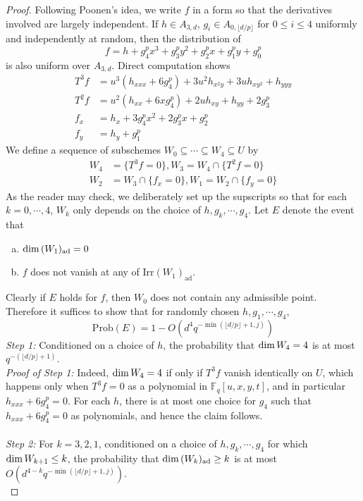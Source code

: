 \documentclass[12pt]{article}
\theoremstyle{plain}
\theoremstyle{definition}
\newcommand{\IF}{\mathbb{F}}
\renewcommand\dim{{\rm dim\,}}
\newcommand{\<}{\langle}
\renewcommand{\>}{\rangle}
\newcommand{\Prob}{\mathrm{Prob}}
\newcommand{\ad}{\mathrm{ad}}
\newcommand{\yk}{\lfloor d/p \rfloor}
\newcommand{\Irr}{\mathrm{Irr}}
\begin{document}
\begin{proof}
Following Poonen's idea, we write $f$ in a form so that the derivatives involved are largely independent. If $h \in A_{3, d}$, $g_i \in A_{0, \yk}$ for $0 \le i \le 4$ uniformly and independently at random, then the distribution of 
$$ f = h + g_4^p x^3  + g_3^p y^2 + g_2^p x + g_1^p y + g_0^p  $$ 
is also uniform over $A_{3, d}$. 
Direct computation shows 
\begin{align*}
T^3 f &= u^3(h_{xxx} + 6 g_4^p) + 3 u^2 h_{x^2 y} + 3 u h_{xy^2} + h_{yyy} \\
T^2 f &= u^2(h_{xx} + 6x g_4^p) + 2 u h_{xy} + h_{yy} + 2 g_3^p \\
f_x &= h_x + 3 g_4^p x^2 + 2 g_3^p x + g_2^p \\
f_y &= h_y + g_1^p
\end{align*}
We define a sequence of subschemes $W_0 \subseteq \cdots \subseteq W_4 \subseteq U$ by 
\begin{align*}
W_4 &= \{ T^3 f = 0 \}, W_3 = W_4 \cap \{ T^2 f = 0 \} \\
W_2 &= W_3 \cap \{ f_x = 0 \}, W_1 = W_2 \cap \{ f_y = 0 \}
\end{align*}
As the reader may check, we deliberately set up the supscripts so that for each $k = 0,\cdots, 4$, $W_k$ only depends on the choice of $h, g_{k}, \cdots, g_4$. Let $E$ denote the event that 
\begin{enumerate}[a.]
\item $\dim (W_1)_\ad = 0$
\item $f$ does not vanish at any of $\Irr (W_1)_\ad$. 
\end{enumerate} 
Clearly if $E$ holds for $f$, then $W_0$ does not contain any admissible point. Therefore it suffices to show that for randomly chosen $h, g_1, \cdots, g_4$,
$$ \Prob(E) = 1 - O(d^4 q^{- \min(\yk + 1, j)})$$
\textit{Step 1:} Conditioned on a choice of $h$, the probability that $\dim W_4 = 4$ is at most $q^{-(\yk + 1)}$. \\
\textit{Proof of Step 1: }Indeed, $\dim W_4 = 4$ if only if $T^3 f$ vanish identically on $U$, which happens only when $T^3 f = 0$ as a polynomial in $\IF_q[u, x, y, t]$, and in particular $h_{xxx} + 6 g_4^p = 0$. For each $h$, there is at most one choice for $g_4$ such that $h_{xxx} + 6 g_4^p = 0$ as polynomials, and hence the claim follows. \\\\
\textit{Step 2:} For $k = 3, 2, 1$, conditioned on a choice of $h, g_k, \cdots, g_4$ for which $\dim W_{k + 1} \le k$, the probability that $\dim (W_k)_\ad \ge k$ is at most $O(d^{4 - k} q^{- \min(\yk + 1, j)})$.\\

\end{proof}
\end{document}
